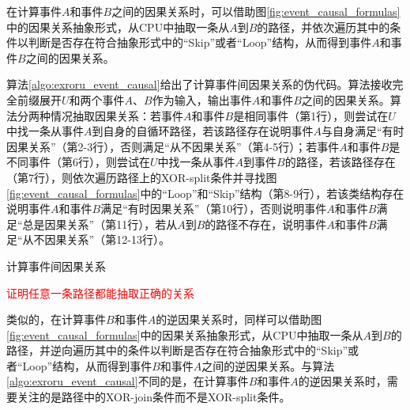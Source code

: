 在计算事件$A$和事件$B$之间的因果关系时，可以借助图\ref{fig:event_causal_formulas}中的因果关系抽象形式，从CPU中抽取一条从$A$到$B$的路径，并依次遍历其中的条件以判断是否存在符合抽象形式中的“Skip”或者“Loop”结构，从而得到事件$A$和事件$B$之间的因果关系。

算法\ref{algo:exroru_event_causal}给出了计算事件间因果关系的伪代码。算法接收完全前缀展开$U$和两个事件$A$、$B$作为输入，输出事件$A$和事件$B$之间的因果关系。算法分两种情况抽取因果关系：若事件$A$和事件$B$是相同事件（第1行），则尝试在$U$中找一条从事件$A$到自身的自循环路径，若该路径存在说明事件$A$与自身满足“有时因果关系”（第2-3行），否则满足“从不因果关系”（第4-5行）；若事件$A$和事件$B$是不同事件（第6行），则尝试在$U$中找一条从事件$A$到事件$B$的路径，若该路径存在（第7行），则依次遍历路径上的XOR-split条件并寻找图\ref{fig:event_causal_formulas}中的“Loop”和“Skip”结构（第8-9行），若该类结构存在说明事件$A$和事件$B$满足“有时因果关系”（第10行），否则说明事件$A$和事件$B$满足“总是因果关系”（第11行），若从$A$到$B$的路径不存在，说明事件$A$和事件$B$满足“从不因果关系”（第12-13行）。

\begin{algorithm}[htbp]
  \LinesNumbered
  \caption{计算事件间因果关系}
  \label{algo:exroru_event_causal}
   {
  	 {
  	} 
  } 
\end{algorithm}

\textcolor{red}{证明任意一条路径都能抽取正确的关系}

类似的，在计算事件$B$和事件$A$的逆因果关系时，同样可以借助图\ref{fig:event_causal_formulas}中的因果关系抽象形式，从CPU中抽取一条从$A$到$B$的路径，并逆向遍历其中的条件以判断是否存在符合抽象形式中的“Skip”或者“Loop”结构，从而得到事件$B$和事件$A$之间的逆因果关系。与算法\ref{algo:exroru_event_causal}不同的是，在计算事件$B$和事件$A$的逆因果关系时，需要关注的是路径中的XOR-join条件而不是XOR-split条件。

